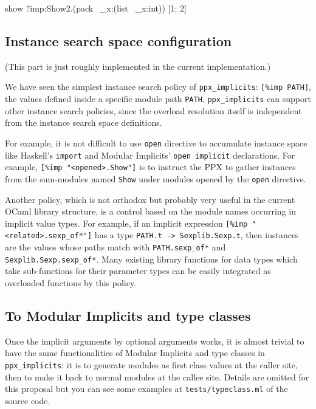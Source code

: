 \documentclass{article}
\newenvironment{Shaded}{}{}
\newcommand{\NormalTok}[1]{{#1}}
\begin{document}
\begin{Shaded}
\begin{Highlighting}[]
  \NormalTok{show ?imp:Show2.(pack ~_x:(}\NormalTok{list} \NormalTok{~_x:int)) [1; 2]}
\end{Highlighting}
\end{Shaded}

\subsection{Instance search space configuration}\label{instance-search-space-configuration}

(This part is just roughly implemented in the current implementation.)

We have seen the simplest instance search policy of
\texttt{ppx\_implicits}: \texttt{{[}\%imp PATH{]}}, the values defined
inside a specific module path \texttt{PATH}. 
\texttt{ppx\_implicits} can support other instance search policies,
since the overload resolution itself is independent from 
the instance search space definitions.

For example, it is not difficult to use \texttt{open} directive to
accumulate instance space like Haskell's \texttt{import} and Modular
Implicits' \texttt{open implicit} declarations. For example,
\texttt{{[}\%imp "\textless{}opened\textgreater{}.Show"{]}} is to
instruct the PPX to gather instances from the sum-modules named
\texttt{Show} under modules opened by the \texttt{open} directive.

Another policy, which is not orthodox but probably very useful in the
current OCaml library structure, is a control based on the module names
occurring in implicit value types. For example, if an implicit
expression
\texttt{{[}\%imp "\textless{}related\textgreater{}.sexp\_of*"{]}} has a
type \texttt{PATH.t -\textgreater{} Sexplib.Sexp.t}, then instances are
the values whose paths match with \texttt{PATH.sexp\_of*} and
\texttt{Sexplib.Sexp.sexp\_of*}. Many existing library functions 
for data types which take sub-functions for their parameter types 
can be easily integrated as overloaded functions by this policy.

\subsection{To Modular Implicits and type
classes}\label{to-modular-implicits-and-type-classes}

Once the implicit arguments by optional arguments works, it is almost
trivial to have the same functionalities of Modular Implicits and type
classes in \texttt{ppx\_implicits}: it is to generate modules as first
class values at the caller site, then to make it back to normal modules
at the callee site.
Details are omitted for this proposal but you can see some examples at
\texttt{tests/typeclass.ml} of the source code.
\end{document}
